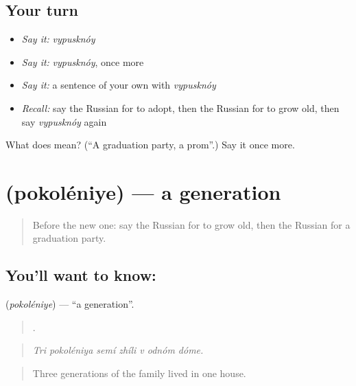 \subsection*{Your turn}
\begin{itemize}
\raggedright
  \item \emph{Say it:} \emph{vypusknóy}
  \item \emph{Say it:} \emph{vypusknóy}, once more
  \item \emph{Say it:} a sentence of your own with \emph{vypusknóy}
  \item \emph{Recall:} say the Russian for to adopt, then the Russian for to grow old, then say \emph{vypusknóy} again
\end{itemize}

\begin{tcolorbox}[breakable,colback=teal!4,colframe=teal!35!black,title={Before you move on}]
What does  mean? (\textquotedblleft{}A graduation party, a prom\textquotedblright{}.) Say it once more.
\end{tcolorbox}
\section[\texorpdfstring{\ru{поколение} (pokoléniye)}{поколение (pokoléniye)}]{ (pokoléniye) — a generation}

\label{lesson:RU-C305-pokoleniye}



\begin{quote}
Before the new one: say the Russian for to grow old, then the Russian for a graduation party.
\end{quote}

\subsection*{You'll want to know: }
\textbf{} (\emph{pokoléniye}) — \textquotedblleft{}a generation\textquotedblright{}.

\begin{quote}
      .
\end{quote}

\begin{quote}
\emph{Tri pokoléniya semí zhíli v odnóm dóme.}
\end{quote}

\begin{quote}
Three generations of the family lived in one house.
\end{quote}

